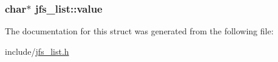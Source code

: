 \label{structjfs__list_a1b1015db06a0db093f83e1c244656f1e}
\hypertarget{structjfs__list_ae71210d9568ffcd012595f41e2b61db9}{
\subsubsection[{value}]{\setlength{\rightskip}{0pt plus 5cm}char$\ast$ {\bf jfs\_\-list::value}}}
\label{structjfs__list_ae71210d9568ffcd012595f41e2b61db9}


The documentation for this struct was generated from the following file:\begin{DoxyCompactItemize}
\item 
include/\hyperlink{jfs__list_8h}{jfs\_\-list.h}\end{DoxyCompactItemize}
